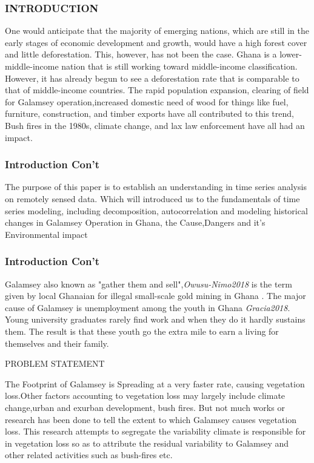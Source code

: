 \documentclass[11pt]{beamer}
\begin{document}
	\begin{frame}
		\frametitle{INTRODUCTION}
		\begin{block}{}
One would anticipate that the majority of emerging nations, which are still in the early stages of economic development and growth, would have a high forest cover and little deforestation. This, however, has not been the case. Ghana is a lower-middle-income nation that is still working toward middle-income classification. However, it has already begun to see a deforestation rate that is comparable to that of middle-income countries. The rapid population expansion, clearing of field for Galamsey operation,increased domestic need of wood for things like fuel, furniture, construction, and timber exports have all contributed to this trend, Bush fires in the 1980s, climate change, and lax law enforcement have all had an impact. \\
       \end{block}
	\end{frame}
     \begin{frame}
     	\frametitle{Introduction Con't}
     	\begin{block}{}
     		The purpose of this paper is to establish an understanding in time series analysis on remotely sensed data. Which will introduced us to the fundamentals of time series modeling, including decomposition, autocorrelation and modeling historical changes in Galamsey Operation in Ghana, the Cause,Dangers and it's Environmental impact 
     	\end{block}
     
     \end{frame}
 \begin{frame}
 	\frametitle{Introduction Con't}
 	\begin{block}{}
 	Galamsey also known as "gather them and sell",\emph{Owusu-Nimo2018} is the term given by local Ghanaian for illegal small-scale gold mining in Ghana . The major cause of Galamsey is unemployment among the youth in Ghana \emph{Gracia2018}. Young university graduates rarely find work and when they do it hardly sustains them. The result is that these youth go the extra mile to earn a living for themselves and their family.
 	
 	\end{block}
 	
 \end{frame}
\begin{frame}
	
	\begin{block}{PROBLEM STATEMENT}
		
		The Footprint of Galamsey is Spreading at a very faster rate, causing vegetation loss.Other factors accounting to vegetation loss may largely include climate change,urban and exurban development, bush fires. But not much works or research has been done to tell the extent to which Galamsey causes vegetation loss. This research attempts to segregate the variability climate is responsible for in vegetation loss so as to attribute the residual variability to Galamsey and other related activities such as bush-fires etc.
	
	\end{block}
\end{frame}
\end{document}
